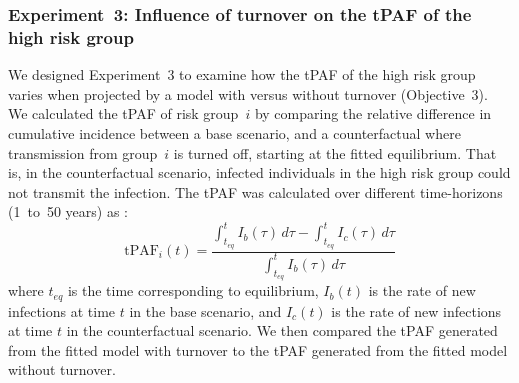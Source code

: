 \subsubsection{Experiment~3: Influence of turnover on the tPAF of the high risk group}
\label{sss:exp-tpaf}
We designed Experiment~3 to examine how the tPAF of the
high risk group varies when projected
by a model with versus without turnover (Objective~3).
We calculated the tPAF of risk group~$i$ by comparing
the relative difference in cumulative incidence between
a base scenario, and a counterfactual where transmission from group~$i$ is turned off,
starting at the fitted equilibrium.
That is, in the counterfactual scenario,
infected individuals in the high risk group could not transmit the infection.
The tPAF was calculated over different time-horizons (1~to~50 years) as
\citep{Mishra2014}:
\begin{equation}
\textrm{tPAF}_i(t) =
  \frac{\displaystyle\int_{t_{eq}}^{t} I_b(\tau) \, d\tau -
        \displaystyle\int_{t_{eq}}^{t} I_c(\tau) \, d\tau}
       {\displaystyle\int_{t_{eq}}^{t} I_b(\tau) \, d\tau}
\end{equation}
where $t_{eq}$ is the time corresponding to equilibrium,
$I_b(t)$ is the rate of new infections at time $t$ in the base scenario,
and $I_c(t)$ is the rate of new infections at time $t$ in the counterfactual scenario.
We then compared the tPAF generated from the fitted model with turnover
to the tPAF generated from the fitted model without turnover.
